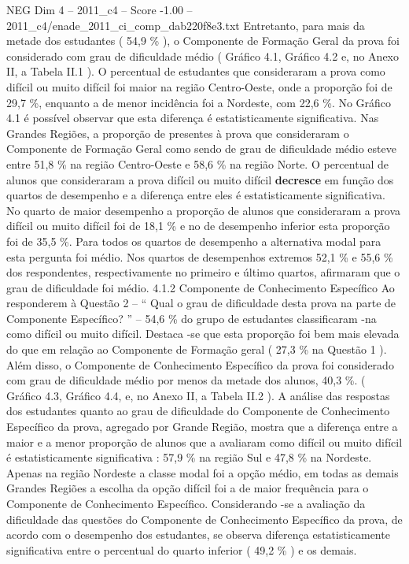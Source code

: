 \begin{textsample}{NEG Dim 4 – 2011\_c4 – Score -1.00 – 2011\_c4/enade\_2011\_ci\_comp\_dab220f8e3.txt}
Entretanto, para mais da metade dos estudantes ( 54,9 \% ), o Componente de Formação Geral da prova foi considerado com grau de dificuldade médio ( Gráfico 4.1, Gráfico 4.2 e, no Anexo II, a Tabela II.1 ).
O percentual de estudantes que consideraram a prova como difícil ou muito difícil foi maior na região Centro-Oeste, onde a proporção foi de 29,7 \%, enquanto a de menor incidência foi a Nordeste, com 22,6 \%.
No Gráfico 4.1 é possível observar que esta diferença é estatisticamente significativa.
Nas Grandes Regiões, a proporção de presentes à prova que consideraram o Componente de Formação Geral como sendo de grau de dificuldade médio esteve entre 51,8 \% na região Centro-Oeste e 58,6 \% na região Norte.
O percentual de alunos que consideraram a prova difícil ou muito difícil \textbf{decresce} em função dos quartos de desempenho e a diferença entre eles é estatisticamente significativa.
No quarto de maior desempenho a proporção de alunos que consideraram a prova difícil ou muito difícil foi de 18,1 \% e no de desempenho inferior esta proporção foi de 35,5 \%.
Para todos os quartos de desempenho a alternativa modal para esta pergunta foi médio.
Nos quartos de desempenhos extremos 52,1 \% e 55,6 \% dos respondentes, respectivamente no primeiro e último quartos, afirmaram que o grau de dificuldade foi médio. 4.1.2 Componente de Conhecimento Específico Ao responderem à Questão 2 – “ Qual o grau de dificuldade desta prova na parte de Componente Específico? ” – 54,6 \% do grupo de estudantes classificaram -na como difícil ou muito difícil.
Destaca -se que esta proporção foi bem mais elevada do que em relação ao Componente de Formação geral ( 27,3 \% na Questão 1 ).
Além disso, o Componente de Conhecimento Específico da prova foi considerado com grau de dificuldade médio por menos da metade dos alunos, 40,3 \%. ( Gráfico 4.3, Gráfico 4.4, e, no Anexo II, a Tabela II.2 ).
A análise das respostas dos estudantes quanto ao grau de dificuldade do Componente de Conhecimento Específico da prova, agregado por Grande Região, mostra que a diferença entre a maior e a menor proporção de alunos que a avaliaram como difícil ou muito difícil é estatisticamente significativa : 57,9 \% na região Sul e 47,8 \% na Nordeste.
Apenas na região Nordeste a classe modal foi a opção médio, em todas as demais Grandes Regiões a escolha da opção difícil foi a de maior frequência para o Componente de Conhecimento Específico.
Considerando -se a avaliação da dificuldade das questões do Componente de Conhecimento Específico da prova, de acordo com o desempenho dos estudantes, se observa diferença estatisticamente significativa entre o percentual do quarto inferior ( 49,2 \% ) e os demais.

\end{textsample}
